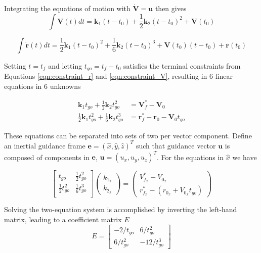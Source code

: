Integrating the equations of motion with $\bm{\dot{V}} = \bm{u}$ then gives
\begin{equation}
\label{eqn:EoM_solve_1}
\int\bm{\dot{V}}(t) dt  = \bm{k}_1(t-t_0) + \frac{1}{2}\bm{k}_2(t-t_0)^2 + \bm{V}(t_0) 
\end{equation}

\begin{equation}
\int \bm{\dot{r}}(t)dt = \frac{1}{2} \bm{k}_1(t-t_0)^2 + \frac{1}{6}\bm{k}_2(t-t_0)^3 + \bm{V}(t_0)(t-t_0) + \bm{r}(t_0) 
\label{eqn:EoM_solve_2}
\end{equation}

Setting $t = t_f$ and letting $t_{go} = t_f - t_0$ satisfies the terminal constraints from Equations \ref{eqn:constraint_r} and \ref{eqn:constraint_V}, resulting in 6 linear equations in 6 unknowns

\begin{align}
\label{eqn:system1}
\bm{k}_1 t_{go} + \frac{1}{2}\bm{k}_2 t_{go}^2 &= \bm{V}_f^* - \bm{V}_0\\
\label{eqn:system2}
\frac{1}{2}\bm{k}_1 t_{go}^2 + \frac{1}{6}\bm{k}_2 t_{go}^3 &= \bm{r}_f^* - \bm{r}_0 - \bm{V}_0t_{go}
\end{align}

These equations can be separated into sets of two per vector component. Define an inertial guidance frame $\bm{e} = (\hat{x},\hat{y},\hat{z})^T$ such that guidance vector $\bm{u}$ is composed of components in $\bm{e}$, $\bm{u} = (u_{x},u_{y},u_{z})^T$. For the equations in $\hat{x}$ we have

\begin{equation}
  \label{eqn:E_system}
  \begin{bmatrix}
    t_{go} & \frac{1}{2}t_{go}^2 \\
    \frac{1}{2}t_{go}^2 & \frac{1}{6}t_{go}^3 \\
  \end{bmatrix}
 \left(
	\begin{matrix}
	k_{1_x} \\ 
	k_{2_x} 
	\end{matrix}
\right) = 
 \left(
	\begin{matrix}
	V_{f_x}^* - V_{0_x} \\ 
	r_{f_x}^* - (r_{0_x} + V_{0_x}t_{go}) 
	\end{matrix}
\right)
\end{equation}

Solving the two-equation system is accomplished by inverting the left-hand matrix, leading to a coefficient matrix $E$
\begin{equation}
E = 
	\begin{bmatrix}
	-2/t_{go} & 6/t_{go}^2 \\
	6/t_{go}^2 & -12/t_{go}^3
	\end{bmatrix}
\end{equation}


